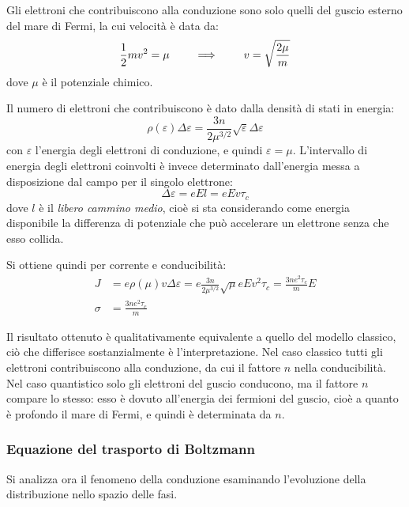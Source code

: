 Gli elettroni che contribuiscono alla conduzione sono solo quelli del guscio esterno del mare di Fermi, la cui velocità è data da:
\begin{equation*}
\frac{1}{2} m v^2 = \mu \qquad\implies\qquad v = \sqrt{\frac{2\mu}{m}}
\end{equation*}
dove $ \mu $ è il potenziale chimico.

Il numero di elettroni che contribuiscono è dato dalla densità di stati in energia:
\begin{equation*}
\rho(\varepsilon) \Delta \varepsilon = \frac{3 n}{2 \mu^{3/2}} \sqrt{\varepsilon} \Delta \varepsilon
\end{equation*}
con $ \varepsilon $ l'energia degli elettroni di conduzione, e quindi $ \varepsilon = \mu $. L'intervallo di energia degli elettroni coinvolti è invece determinato dall'energia messa a disposizione dal campo per il singolo elettrone:
\begin{equation*}
\Delta \varepsilon = e E l = e E v \tau_c
\end{equation*}
dove $ l $ è il \textit{libero cammino medio}, cioè si sta considerando come energia disponibile la differenza di potenziale che può accelerare un elettrone senza che esso collida. 

Si ottiene quindi per corrente e conducibilità:
\begin{align*}
J &= e \rho(\mu) v \Delta \varepsilon = e \frac{3n}{2 \mu^{3/2}} \sqrt{\mu} e E v^2 \tau_c = \frac{3ne^2 \tau_c}{m} E\\
\sigma &= \frac{3ne^2 \tau_c}{m}
\end{align*}

Il risultato ottenuto è qualitativamente equivalente a quello del modello classico, ciò che differisce sostanzialmente è l'interpretazione. Nel caso classico tutti gli elettroni contribuiscono alla conduzione, da cui il fattore $ n $ nella conducibilità. Nel caso quantistico solo gli elettroni del guscio conducono, ma il fattore $ n $ compare lo stesso: esso è dovuto all'energia dei fermioni del guscio, cioè a quanto è profondo il mare di Fermi, e quindi è determinata da $ n $.

\subsubsection{Equazione del trasporto di Boltzmann}

Si analizza ora il fenomeno della conduzione esaminando l'evoluzione della distribuzione nello spazio delle fasi.
\newline

